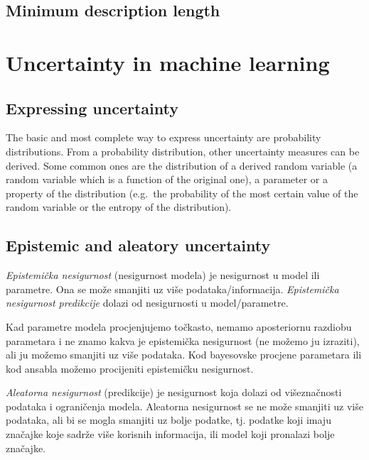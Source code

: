 \documentclass{article}
\begin{document}
\subsection{Minimum description length}



\section{Uncertainty in machine learning}


\subsection{Expressing uncertainty}

The basic and most complete way to express uncertainty are probability distributions. From a probability distribution, other uncertainty measures can be derived. Some common ones are the distribution of a derived random variable (a random variable which is a function of the original one), a parameter or a property of the distribution (e.g.\ the probability of the most certain value of the random variable or the entropy of the distribution).




\subsection{Epistemic and aleatory uncertainty}

\emph{Epistemička nesigurnost} (nesigurnost modela) je nesigurnost u model ili parametre. Ona se može smanjiti uz više podataka/informacija. \emph{Epistemička nesigurnost predikcije} dolazi od nesigurnosti u model/parametre.

Kad parametre modela procjenjujemo točkasto, nemamo aposteriornu razdiobu parametara i ne znamo kakva je epistemička nesigurnost (ne možemo ju izraziti), ali ju možemo smanjiti uz više podataka. Kod bayesovske procjene parametara ili kod ansabla možemo procijeniti epistemičku nesigurnost.

\emph{Aleatorna nesigurnost} (predikcije) je nesigurnost koja dolazi od višeznačnosti podataka i ograničenja modela. Aleatorna nesigurnost se ne može smanjiti uz više podataka, ali bi se mogla smanjiti uz bolje podatke, tj. podatke koji imaju značajke koje sadrže više korisnih informacija, ili model koji pronalazi bolje značajke.
\end{document}
